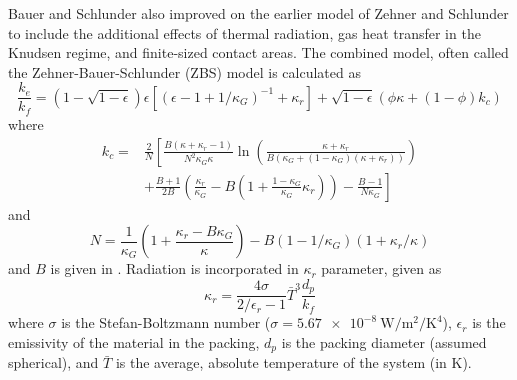 Bauer and Schlunder \cite{bauer1978effective} also improved on the earlier model of Zehner and Schlunder to include the additional effects of thermal radiation, gas heat transfer in the Knudsen regime, and finite-sized contact areas. The combined model, often called the Zehner-Bauer-Schlunder (ZBS) model is calculated as
\begin{equation}
    \frac{k_e}{k_f} = \left(1-\sqrt{1-\epsilon}\right)\epsilon\left[\left(\epsilon-1+1/\kappa_G\right)^{-1} + \kappa_r\right]+\sqrt{1-\epsilon}\left(\phi\kappa + (1-\phi)k_c\right)
\end{equation}
where
\begin{equation}
\begin{split}
    k_c ={} &\frac{2}{N}\left[\frac{B(\kappa+\kappa_r -1)}{N^2\kappa_G\kappa}\ln\left(\frac{\kappa+\kappa_r}{B(\kappa_G+(1-\kappa_G)(\kappa+\kappa_r))}\right) \right.\\
    &+\left.\frac{B+1}{2B}\left(\frac{\kappa_r}{\kappa_G} - B\left(1+\frac{1-\kappa_G}{\kappa_G}\kappa_r\right) \right) - \frac{B-1}{N\kappa_G}\right]
\end{split}
\end{equation}
and
\begin{equation}
    N = \frac{1}{\kappa_G}\left(1+\frac{\kappa_r-B\kappa_G}{\kappa} \right) - B(1-1/\kappa_G)(1+\kappa_r/\kappa)
\end{equation}
and $B$ is given in . Radiation is incorporated in $\kappa_r$ parameter, given as
\begin{equation}
    \kappa_r = \frac{4\sigma}{2/\epsilon_r - 1}\bar{T}^3\frac{d_p}{k_f}
\end{equation}
where $\sigma$ is the Stefan-Boltzmann number ($\sigma = \SI{5.67e-8}{\watt\per\meter\squared\per\kelvin\tothe{4}}$), $\epsilon_r$ is the emissivity of the material in the packing, $d_p$ is the packing diameter (assumed spherical), and $\bar{T}$ is the average, absolute temperature of the system (in \si{\kelvin}). 

